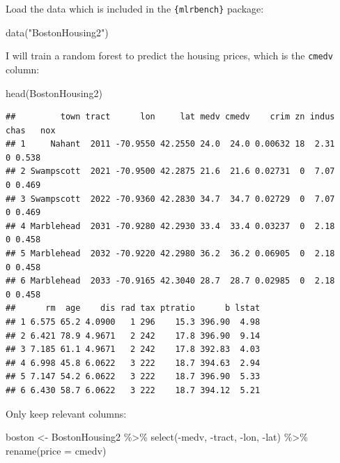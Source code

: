 \documentclass[
]{article}
\newenvironment{Shaded}{\begin{snugshade}}{\end{snugshade}}
\newcommand{\AttributeTok}[1]{\textcolor[rgb]{0.77,0.63,0.00}{#1}}
\newcommand{\FunctionTok}[1]{\textcolor[rgb]{0.00,0.00,0.00}{#1}}
\newcommand{\NormalTok}[1]{#1}
\newcommand{\OtherTok}[1]{\textcolor[rgb]{0.56,0.35,0.01}{#1}}
\newcommand{\SpecialCharTok}[1]{\textcolor[rgb]{0.00,0.00,0.00}{#1}}
\newcommand{\StringTok}[1]{\textcolor[rgb]{0.31,0.60,0.02}{#1}}
\begin{document}
Load the data which is included in the \texttt{\{mlrbench\}} package:

\begin{Shaded}
\begin{Highlighting}[]
\FunctionTok{data}\NormalTok{(}\StringTok{"BostonHousing2"}\NormalTok{)}
\end{Highlighting}
\end{Shaded}

I will train a random forest to predict the housing prices, which is the \texttt{cmedv} column:

\begin{Shaded}
\begin{Highlighting}[]
\FunctionTok{head}\NormalTok{(BostonHousing2)}
\end{Highlighting}
\end{Shaded}

\begin{verbatim}
##         town tract      lon     lat medv cmedv    crim zn indus chas   nox
## 1     Nahant  2011 -70.9550 42.2550 24.0  24.0 0.00632 18  2.31    0 0.538
## 2 Swampscott  2021 -70.9500 42.2875 21.6  21.6 0.02731  0  7.07    0 0.469
## 3 Swampscott  2022 -70.9360 42.2830 34.7  34.7 0.02729  0  7.07    0 0.469
## 4 Marblehead  2031 -70.9280 42.2930 33.4  33.4 0.03237  0  2.18    0 0.458
## 5 Marblehead  2032 -70.9220 42.2980 36.2  36.2 0.06905  0  2.18    0 0.458
## 6 Marblehead  2033 -70.9165 42.3040 28.7  28.7 0.02985  0  2.18    0 0.458
##      rm  age    dis rad tax ptratio      b lstat
## 1 6.575 65.2 4.0900   1 296    15.3 396.90  4.98
## 2 6.421 78.9 4.9671   2 242    17.8 396.90  9.14
## 3 7.185 61.1 4.9671   2 242    17.8 392.83  4.03
## 4 6.998 45.8 6.0622   3 222    18.7 394.63  2.94
## 5 7.147 54.2 6.0622   3 222    18.7 396.90  5.33
## 6 6.430 58.7 6.0622   3 222    18.7 394.12  5.21
\end{verbatim}

Only keep relevant columns:

\begin{Shaded}
\begin{Highlighting}[]
\NormalTok{boston }\OtherTok{\textless{}{-}}\NormalTok{ BostonHousing2 }\SpecialCharTok{\%\textgreater{}\%} 
    \FunctionTok{select}\NormalTok{(}\SpecialCharTok{{-}}\NormalTok{medv, }\SpecialCharTok{{-}}\NormalTok{tract, }\SpecialCharTok{{-}}\NormalTok{lon, }\SpecialCharTok{{-}}\NormalTok{lat) }\SpecialCharTok{\%\textgreater{}\%} 
    \FunctionTok{rename}\NormalTok{(}\AttributeTok{price =}\NormalTok{ cmedv)}
\end{Highlighting}
\end{Shaded}
\end{document}
